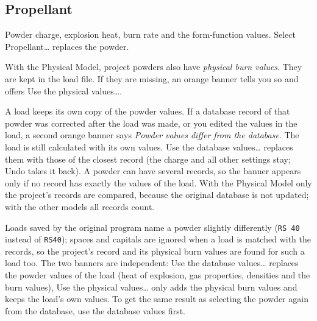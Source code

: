 \documentclass[11pt,a4paper]{article}
\newcommand{\ui}[1]{\textsf{#1}}
\begin{document}
\subsection{Propellant}\label{sec:propellant}
Powder charge, explosion heat, burn rate and the form-function values. \ui{Select Propellant\dots} replaces the powder.

With the Physical Model, project powders also have \emph{physical burn values}. They are kept in the load file. If they are missing, an
orange banner tells you so and offers \ui{Use the physical values\dots}.

A load keeps its own copy of the powder values. If a database record of that powder was corrected after the load was made, or you edited the
values in the load, a second orange banner says \emph{Powder values differ from the database}. The load is still calculated with its own
values. \ui{Use the database values\dots} replaces them with those of the closest record (the charge and all other settings stay; \ui{Undo}
takes it back). A powder can have several records, so the banner appears only if no record has exactly the values of the load. With the
Physical Model only the project's records are compared, because the original database is not updated; with the other models all records count.

Loads saved by the original program name a powder slightly differently (\texttt{RS 40} instead of \texttt{RS40}); spaces and capitals are ignored when a load is
matched with the records, so the project's record and its physical burn values are found for such a load too. The two banners are independent:
\ui{Use the database values\dots} replaces the powder values of the load (heat of explosion, gas properties, densities and the burn values),
\ui{Use the physical values\dots} only adds the physical burn values and keeps the load's own values. To get the same result as selecting the powder
again from the database, use the database values first.
\end{document}
